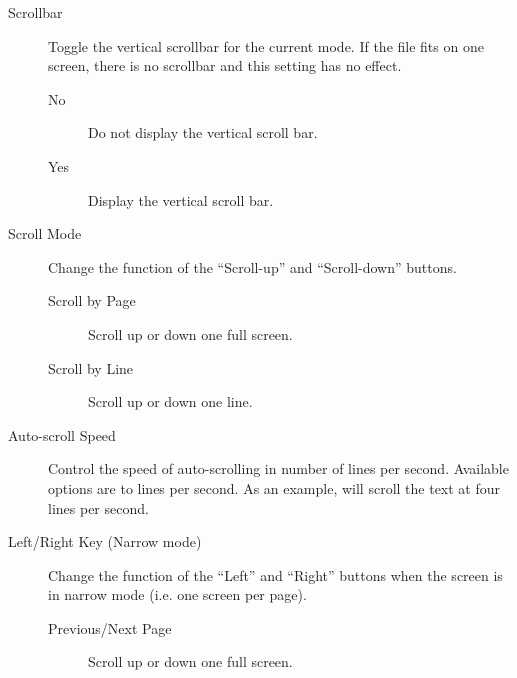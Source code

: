 \begin{description}
\begin{description}
\begin{description}
\begin{description}
                    \item[Scrollbar] Toggle the vertical scrollbar for the
                    current mode. If the file fits on one screen, there is no
                    scrollbar and this setting has no effect.
                        \begin{description}
                            \item[No] Do not display the vertical scroll bar.
                            \item[Yes] Display the vertical scroll bar.
                        \end{description}
                    \item[Scroll Mode] Change the function of the ``Scroll-up''
                    and ``Scroll-down'' buttons.
                        \begin{description}
                            \item[Scroll by Page] Scroll up or down one full screen.
                            \item[Scroll by Line] Scroll up or down one line.
                        \end{description}
                    \item[Auto-scroll Speed] Control the speed of auto-scrolling
                    in number of lines per second.  Available options are
                     to  lines per second. As an example,
                     will scroll the text at four lines per second.
                    \item[Left/Right Key (Narrow mode)] Change the function of
                    the ``Left'' and ``Right'' buttons when the screen is in
                    narrow mode (i.e. one screen per page).
                    \begin{description}
                        \item[Previous/Next Page] Scroll up or down one full screen.

\end{description}
\end{description}
\end{description}
\end{description}
\end{description}
